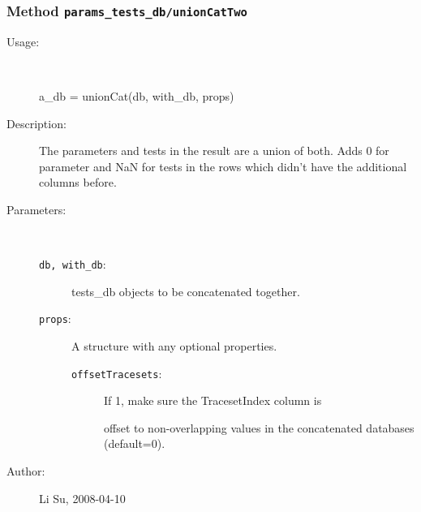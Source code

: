 \subsubsection[Method \texttt{unionCatTwo}]{Method \texttt{params\_tests\_db/unionCatTwo}}%
%
\label{ref_params_tests_db__unionCatTwo}%
\hypertarget{ref_params_tests_db__unionCatTwo}{}%
\begin{description}
%
\item[Usage:]~%
\begin{lyxcode}%
a\_db = unionCat(db, with\_db, props)
%
\end{lyxcode}%
%
\item[Description:]%
The parameters and tests in the result are a union of both. Adds 0 for
 parameter and NaN for tests in the rows which didn't have the additional
 columns before.
\item[Parameters:]~
\begin{description}%
\item[\texttt{db, with\_db}:]
 tests\_db objects to be concatenated together.
\item[\texttt{props}:]
 A structure with any optional properties.
\begin{description}%
\item[\texttt{offsetTracesets}:]
 If 1, make sure the TracesetIndex column is

offset to non-overlapping values in the concatenated
databases (default=0).
\end{description}%
\end{description}%
%
%
%
%
\item[Author:]%
Li Su, 2008-04-10
%
\end{description}
\methodline%
